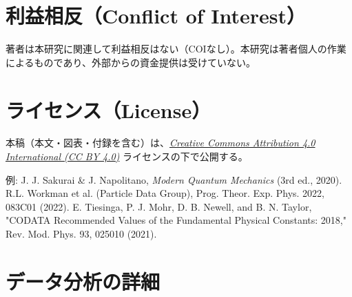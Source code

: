 \documentclass[11pt,a4paper,ja=standard]{ltjarticle}
\begin{document}
\section*{利益相反（Conflict of Interest）}
著者は本研究に関連して利益相反はない（COIなし）。本研究は著者個人の作業によるものであり、外部からの資金提供は受けていない。

\section*{ライセンス（License）}
本稿（本文・図表・付録を含む）は、\href{http://creativecommons.org/licenses/by/4.0/}{\textit{Creative Commons Attribution 4.0 International (CC BY 4.0)}} ライセンスの下で公開する。

\begin{thebibliography}{9}
    例: J. J. Sakurai \& J. Napolitano, \textit{Modern Quantum Mechanics} (3rd ed., 2020).
    R.L. Workman et al. (Particle Data Group), Prog. Theor. Exp. Phys. 2022, 083C01 (2022).
    E. Tiesinga, P. J. Mohr, D. B. Newell, and B. N. Taylor, "CODATA Recommended Values of the Fundamental Physical Constants: 2018," Rev. Mod. Phys. 93, 025010 (2021).
\end{thebibliography}

\appendix
\section{データ分析の詳細}
\end{document}
